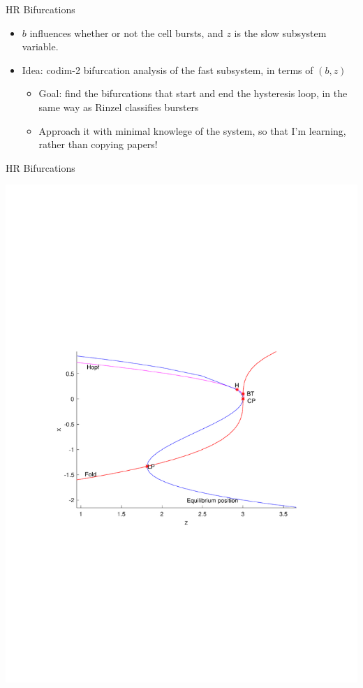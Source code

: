 \documentclass{beamer}
\begin{document}
\begin{frame}[label={sec:org4d30897}]{HR Bifurcations}
\begin{itemize}
\item \(b\) influences whether or not the cell bursts, and \(z\) is the slow subsystem variable.
\item Idea: codim-2 bifurcation analysis of the fast subsystem, in terms of \((b,z)\)
\begin{itemize}
\item Goal: find the bifurcations that start and end the hysteresis loop, in the same way as Rinzel classifies bursters
\item Approach it with minimal knowlege of the system, so that I'm learning, rather than copying papers!
\end{itemize}
\end{itemize}
\end{frame}

\begin{frame}[label={sec:org50d8ee7}]{HR Bifurcations}
\begin{center}
\includegraphics[trim={3cm 9cm 4cm 10cm}, clip,height=.9\textheight]{HRzbBif2.pdf}
\end{center}
\end{frame}
\end{document}
